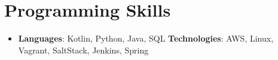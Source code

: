 \documentclass[letterpaper,11pt]{article}
\newcommand{\resumeSubHeadingListStart}{\begin{itemize}[leftmargin=*]}
\newcommand{\resumeSubHeadingListEnd}{\end{itemize}}
\begin{document}
\section{Programming Skills}
  \resumeSubHeadingListStart
    \item{
      \textbf{Languages}{: Kotlin, Python, Java, SQL}
      \hfill
      \textbf{Technologies}{: AWS, Linux, Vagrant, SaltStack, Jenkins, Spring}
    }
  \resumeSubHeadingListEnd


\end{document}
